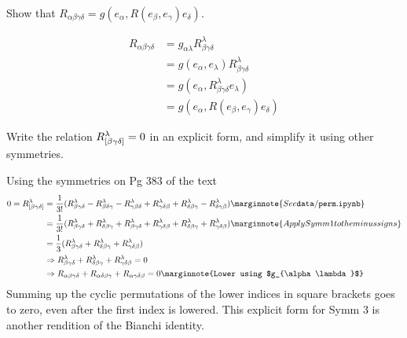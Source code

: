 \documentclass[10pt]{article}
\begin{document}
\begin{example}
	Show that $R_{\alpha\beta\gamma\delta}=g(e_\alpha,R(e_\beta,e_\gamma)e_\delta)$.
\end{example}
\sol $$
\begin{aligned}
	R_{\alpha\beta\gamma\delta}&=g_{\alpha\lambda}R_{\beta\gamma\delta}^\lambda\\
	&=g(e_\alpha,e_\lambda)R_{\beta\gamma\delta}^\lambda\\
	&=g(e_\alpha,R_{\beta\gamma\delta}^\lambda e_\lambda)\\
	&=g(e_\alpha,R(e_\beta,e_\gamma)e_\delta)
\end{aligned}$$


\begin{example}\label{b3e13}
	Write the relation $R_{[\beta\gamma\delta]}^\lambda=0$ in an explicit form, and simplify it using other symmetries.
\end{example}
\sol Using the symmetries on Pg 383 of the text
$$
\begin{aligned}
	0=R_{[\beta\gamma\delta]}^\lambda &= \frac{1}{3!} \p{
		R_{\beta\gamma\delta}^\lambda
		- R_{\beta\delta\gamma}^\lambda
		- R_{\gamma\beta\delta}^\lambda
		+ R_{\gamma\delta\beta}^\lambda
		+ R_{\delta\beta\gamma}^\lambda
		- R_{\delta\gamma\beta}^\lambda}\marginnote{See \tt{data/perm.ipynb}}\\
	&= \frac{1}{3!} \p{
		R_{\beta\gamma\delta}^\lambda
		+ R_{\delta\beta\gamma}^\lambda
		+ R_{\beta\gamma\delta}^\lambda
		+ R_{\gamma\delta\beta}^\lambda
		+ R_{\delta\beta\gamma}^\lambda
		+ R_{\gamma\delta\beta}^\lambda}\marginnote{Apply Symm 1 to the minus signs}\\
	&= \frac{1}{3} \p{
		R_{\beta\gamma\delta}^\lambda
		+ R_{\delta\beta\gamma}^\lambda
		+ R_{\gamma\delta\beta}^\lambda}\\
	&\Rightarrow R_{\beta\gamma\delta}^\lambda + R_{\delta\beta\gamma}^\lambda+ R_{\gamma\delta\beta}^\lambda=0\\
	&\Rightarrow R_{\alpha\beta\gamma\delta} + R_{\alpha\delta\beta\gamma}+ R_{\alpha\gamma\delta\beta}=0\marginnote{Lower using $g_{\alpha\lambda}$}
\end{aligned}$$
Summing up the cyclic permutations of the lower indices in square brackets goes to zero, even after the first index is lowered. This explicit form for Symm 3 is another rendition of the Bianchi identity.
\end{document}
